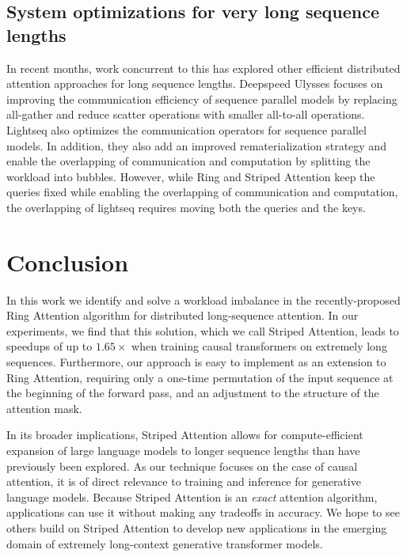 \subsection{System optimizations for very long sequence lengths} In recent months, work concurrent to this has explored other efficient distributed attention approaches for long sequence lengths. Deepspeed Ulysses \cite{jacobs2023deepspeed} focuses on improving the communication efficiency of sequence parallel models by replacing all-gather and reduce scatter operations with smaller all-to-all operations. Lightseq \cite{li2023lightseq} also optimizes the communication operators for sequence parallel models. In addition, they also add an improved rematerialization strategy and enable the overlapping of communication and computation by splitting the workload into bubbles. However, while Ring and Striped Attention keep the queries fixed while enabling the overlapping of communication and computation, the overlapping of lightseq requires moving both the queries and the keys.

\section{Conclusion}
In this work we identify and solve a workload imbalance in the recently-proposed Ring Attention algorithm for distributed long-sequence attention. In our experiments, we find that this solution, which we call Striped Attention, leads to speedups of up to $1.65\times$ when training causal transformers on extremely long sequences. Furthermore, our approach is easy to implement as an extension to Ring Attention, requiring only a one-time permutation of the input sequence at the beginning of the forward pass, and an adjustment to the structure of the attention mask.

In its broader implications, Striped Attention allows for compute-efficient expansion of large language models to longer sequence lengths than have previously been explored. As our technique focuses on the case of causal attention, it is of direct relevance to training and inference for generative language models. Because Striped Attention is an \emph{exact} attention algorithm, applications can use it without making any tradeoffs in accuracy. We hope to see others build on Striped Attention to develop new applications in the emerging domain of extremely long-context generative transformer models.



